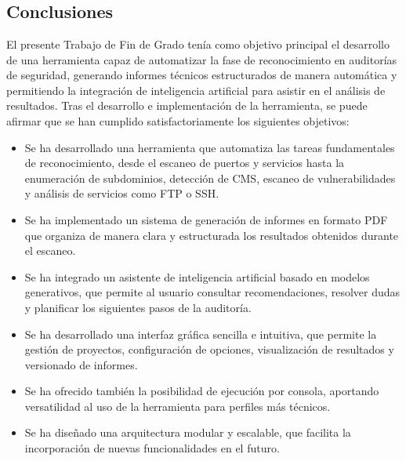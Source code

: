 \chapter{\conclusionsname}
\newpage
\begin{parskipenv}
\section{Conclusiones}
El presente Trabajo de Fin de Grado tenía como objetivo principal el desarrollo de una herramienta capaz de automatizar la fase de reconocimiento en auditorías de seguridad, generando informes técnicos estructurados de manera automática y permitiendo la integración de inteligencia artificial para asistir en el análisis de resultados. Tras el desarrollo e implementación de la herramienta, se puede afirmar que se han cumplido satisfactoriamente los siguientes objetivos:

\begin{itemize}
    \item Se ha desarrollado una herramienta que automatiza las tareas fundamentales de reconocimiento, desde el escaneo de puertos y servicios hasta la enumeración de subdominios, detección de CMS, escaneo de vulnerabilidades y análisis de servicios como FTP o SSH.
    
    \item Se ha implementado un sistema de generación de informes en formato PDF que organiza de manera clara y estructurada los resultados obtenidos durante el escaneo.
    
    \item Se ha integrado un asistente de inteligencia artificial basado en modelos generativos, que permite al usuario consultar recomendaciones, resolver dudas y planificar los siguientes pasos de la auditoría.
    
    \item Se ha desarrollado una interfaz gráfica sencilla e intuitiva, que permite la gestión de proyectos, configuración de opciones, visualización de resultados y versionado de informes.
    
    \item Se ha ofrecido también la posibilidad de ejecución por consola, aportando versatilidad al uso de la herramienta para perfiles más técnicos.
    
    \item Se ha diseñado una arquitectura modular y escalable, que facilita la incorporación de nuevas funcionalidades en el futuro.
\end{itemize}


\end{parskipenv}
